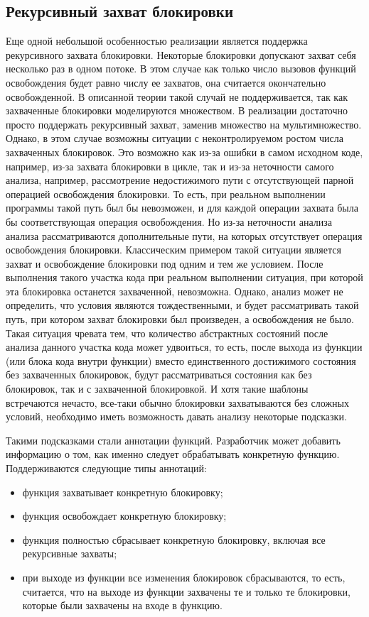 \subsection{Рекурсивный захват блокировки}
Еще одной небольшой особенностью реализации является поддержка рекурсивного захвата блокировки. 
Некоторые блокировки допускают захват себя несколько раз в одном потоке.
В этом случае как только число вызовов функций освобождения будет равно числу ее захватов, она считается окончательно освобожденной.
В описанной теории такой случай не поддерживается, так как захваченные блокировки моделируются множеством.
В реализации достаточно просто поддержать рекурсивный захват, заменив множество на мультимножество.
Однако, в этом случае возможны ситуации с неконтролируемом ростом числа захваченных блокировок.
Это возможно как из-за ошибки в самом исходном коде, например, из-за захвата блокировки в цикле, так и из-за неточности самого анализа, например, рассмотрение недостижимого пути с отсутствующей парной операцией освобождения блокировки.
То есть, при реальном выполнении программы такой путь был бы невозможен, и для каждой операции захвата была бы соответствующая операция освобождения.
Но из-за неточности анализа анализа рассматриваются дополнительные пути, на которых отсутствует операция освобождения блокировки.
Классическим примером такой ситуации является захват и освобождение блокировки под одним и тем же условием. 
После выполнения такого участка кода при реальном выполнении ситуация, при которой эта блокировка останется захваченной, невозможна.
Однако, анализ может не определить, что условия являются тождественными, и будет рассматривать такой путь, при котором захват блокировки был произведен, а освобождения не было.
Такая ситуация чревата тем, что количество абстрактных состояний после анализа данного участка кода может удвоиться, то есть, после выхода из функции (или блока кода внутри функции) вместо единственного достижимого состояния без захваченных блокировок, будут рассматриваться состояния как без блокировок, так и с захваченной блокировкой.
И хотя такие шаблоны встречаются нечасто, все-таки обычно блокировки захватываются без сложных условий, необходимо иметь возможность давать анализу некоторые подсказки.

Такими подсказками стали аннотации функций.
Разработчик может добавить информацию о том, как именно следует обрабатывать конкретную функцию.
Поддерживаются следующие типы аннотаций:
\begin{itemize}
\item функция захватывает конкретную блокировку;
\item функция освобождает конкретную блокировку;
\item функция полностью сбрасывает конкретную блокировку, включая все рекурсивные захваты;
\item при выходе из функции все изменения блокировок сбрасываются, то есть, считается, что на выходе из функции захвачены те и только те блокировки, которые были захвачены на входе в функцию.
\end{itemize}

